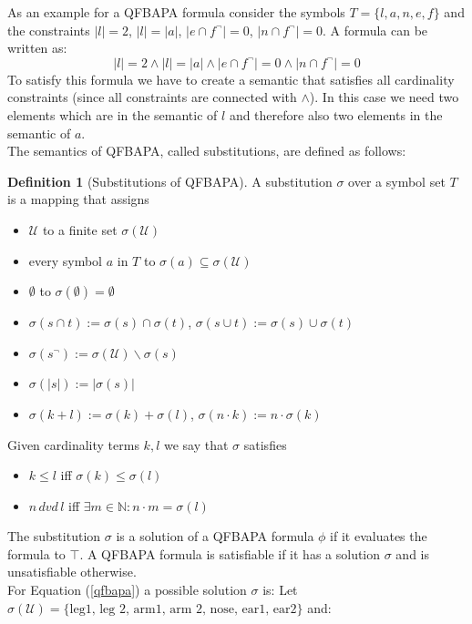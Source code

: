 \documentclass{book}
\theoremstyle{break}
\theoremstyle{definition}
\newtheorem{mydef}{Definition}
\begin{document}
As an example for a QFBAPA formula consider the symbols $T=\{l, a, n, e, f\}$ and the constraints $|l|=2$, $|l|=|a|$, $|e\cap f^\neg|=0$, $|n\cap f^\neg|=0$. A formula can be written as: 
\begin{equation}\label{qfbapa}
|l|=2\wedge|l|=|a|\wedge |e\cap f^\neg|=0\wedge |n\cap f^\neg|=0
\end{equation}
To satisfy this formula we have to create a semantic that satisfies all cardinality constraints (since all constraints are connected with $\wedge$). In this case we need two elements which are in the semantic of $l$ and therefore also two elements in the semantic of $a$.\\
The semantics of QFBAPA, called substitutions, are defined as follows:
\begin{mydef}[Substitutions of QFBAPA]
A substitution $\sigma$ over a symbol set $T$ is a mapping that assigns
\begin{itemize}
\item $\mathcal{U}$ to a finite set $\sigma(\mathcal{U})$
\item every symbol $a$ in $T$ to $\sigma(a)\subseteq\sigma(\mathcal{U})$
\item $\emptyset$ to $\sigma(\emptyset)=\emptyset$
\item $\sigma(s\cap t):= \sigma(s)\cap \sigma(t)$, $\sigma(s\cup t):= \sigma(s)\cup \sigma(t)$
\item $\sigma(s^\neg):=\sigma(\mathcal{U})\backslash \sigma(s)$
\item $\sigma(|s|):=|\sigma(s)|$
\item $\sigma(k+l):=\sigma(k)+\sigma(l)$, $\sigma(n\cdot k):= n\cdot \sigma(k)$
\end{itemize}
Given cardinality terms $k,l$ we say that $\sigma$ satisfies
\begin{itemize}
\item $k\leq l$ iff $\sigma(k)\leq \sigma(l)$
\item $n\,dvd\,l$ iff $\exists m\in\mathbb{N}:n\cdot m = \sigma(l)$
\end{itemize}
\end{mydef}
The substitution $\sigma$ is a solution of a QFBAPA formula $\phi$ if it evaluates the formula to $\top$. A QFBAPA formula is satisfiable if it has a solution $\sigma$ and is unsatisfiable otherwise.\\
For Equation (\ref{qfbapa}) a possible solution $\sigma$ is: Let $\sigma(\mathcal{U})=\{\text{leg1, leg 2, arm1, arm 2, nose, ear1, ear2}\}$ and:
\end{document}
